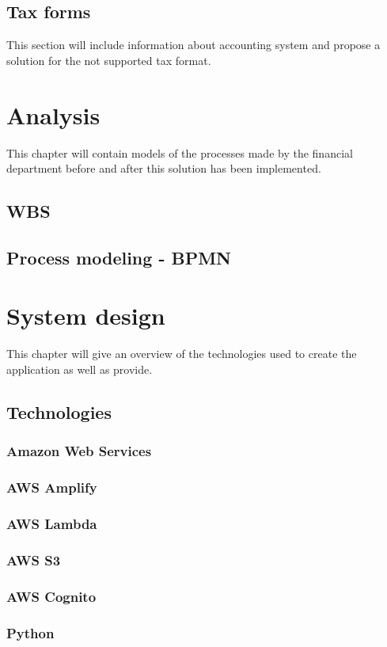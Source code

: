 \documentclass[12pt,oneside]{fithesis2}
\begin{document}
    \section{Tax forms}
    This section will include information about accounting system and propose a solution for the not supported tax format.
    \chapter{Analysis}
    This chapter will contain models of the processes made by the financial department before and after this solution has been implemented.
    \section{WBS}
    \section{Process modeling - BPMN}
    \chapter{System design}
    This chapter will give an overview of the technologies used to create the application as well as provide.
    \section{Technologies}
    \subsection{Amazon Web Services}
    \subsection{AWS Amplify}
    \subsection{AWS Lambda}
    \subsection{AWS S3}
    \subsection{AWS Cognito}
    \subsection{Python}
\end{document}
